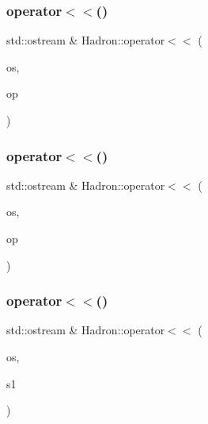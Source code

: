 \subsubsection{\texorpdfstring{operator$<$$<$()}{operator<<()}\hspace{0.1cm}{\footnotesize\ttfamily [42/48]}}
{\footnotesize\ttfamily std\+::ostream \& Hadron\+::operator$<$$<$ (\begin{DoxyParamCaption}\item[{std\+::ostream \&}]{os,  }\item[{const \mbox{\hyperlink{structHadron_1_1SingleHadronQuarkDeriv__t}{Single\+Hadron\+Quark\+Deriv\+\_\+t}} \&}]{op }\end{DoxyParamCaption})}

\mbox{\label{namespaceHadron_a4875d0c001c7eed8b1cb2f65a5e9fb6f}} 
\subsubsection{\texorpdfstring{operator$<$$<$()}{operator<<()}\hspace{0.1cm}{\footnotesize\ttfamily [43/48]}}
{\footnotesize\ttfamily std\+::ostream \& Hadron\+::operator$<$$<$ (\begin{DoxyParamCaption}\item[{std\+::ostream \&}]{os,  }\item[{const \mbox{\hyperlink{structHadron_1_1KeySingleHadronQuarkDeriv__t}{Key\+Single\+Hadron\+Quark\+Deriv\+\_\+t}} \&}]{op }\end{DoxyParamCaption})}

\mbox{\label{namespaceHadron_a800dbac093bd07f370068965de5868b3}} 
\subsubsection{\texorpdfstring{operator$<$$<$()}{operator<<()}\hspace{0.1cm}{\footnotesize\ttfamily [44/48]}}
{\footnotesize\ttfamily std\+::ostream \& Hadron\+::operator$<$$<$ (\begin{DoxyParamCaption}\item[{std\+::ostream \&}]{os,  }\item[{const \mbox{\hyperlink{namespaceHadron_aa588220689caea8a6aad4d0296526e6b}{Map\+Single\+Hadron\+Quark\+Deriv\+\_\+t}} \&}]{s1 }\end{DoxyParamCaption})}

